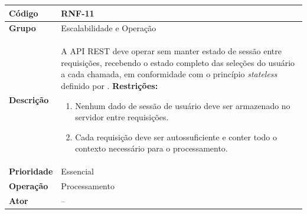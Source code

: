 \FloatBarrier
\begin{quadro}[htb]
  \caption{RNF-11 -- API \textit{stateless} (sem estado de sessão no servidor)}
  \label{quad:rnf11}
  \begin{tabular}{|p{3.2cm}|p{11.8cm}|}
    \hline
    \textbf{Código}     & RNF-11                                                                              \\ \hline
    \textbf{Grupo}      & Escalabilidade e Operação                                                           \\ \hline
    \textbf{Descrição}  &
    A API REST deve operar sem manter estado de sessão entre requisições, recebendo o estado completo das seleções do usuário a cada chamada, em conformidade com o princípio \textit{stateless} definido por \textcite{Fielding2000}.
    \textbf{Restrições:}
    \begin{enumerate}[nosep,leftmargin=1.2em,topsep=2pt,partopsep=0pt,parsep=0pt,itemsep=1pt]
      \item Nenhum dado de sessão de usuário deve ser armazenado no servidor entre requisições.
      \item Cada requisição deve ser autossuficiente e conter todo o contexto necessário para o processamento.
    \end{enumerate} \\ \hline
    \textbf{Prioridade} & Essencial                                                                           \\ \hline
    \textbf{Operação}   & Processamento                                                                       \\ \hline
    \textbf{Ator}       & --                                                                                  \\ \hline
  \end{tabular}
\end{quadro}

